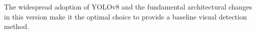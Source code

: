\documentclass{erauthesis}
\begin{document}
The widespread adoption of YOLOv8 and the fundamental architectural changes in this version make it the optimal choice to provide a baseline visual detection method.













\end{document}

